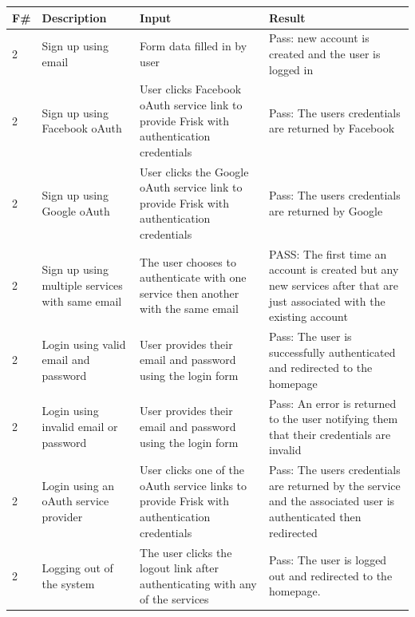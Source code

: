 \begin{longtable}{@{}p{}p{}p{}p{}@{}}
	\toprule
	F\# & Description & Input & Result \\ \midrule
	
	2 & Sign up using email & Form data filled in by user & \textcolor{PassGreen}{Pass}: new account is created and the user is logged in\\
	
	2 & Sign up using Facebook oAuth & User clicks Facebook oAuth service link to provide Frisk with authentication credentials & \textcolor{PassGreen}{Pass}: The users credentials are returned by Facebook \\
	
	2 & Sign up using Google oAuth & User clicks the Google oAuth service link to provide Frisk with authentication credentials & \textcolor{PassGreen}{Pass}: The users credentials are returned by Google \\
	
	2 & Sign up using multiple services with same email & The user chooses to authenticate with one service then another with the same email & \textcolor{PassGreen}{PASS}: The first time an account is created but any new services after that are just associated with the existing account \\

	2 & Login using valid email and password & User provides their email and password using the login form & \textcolor{PassGreen}{Pass}: The user is successfully authenticated and redirected to the homepage \\
	
	2 & Login using invalid email or password & User provides their email and password using the login form &  \textcolor{PassGreen}{Pass}: An error is returned to the user notifying them that their credentials are invalid \\
	
	2 & Login using an oAuth service provider & User clicks one of the oAuth service links to provide Frisk with authentication credentials & \textcolor{PassGreen}{Pass}: The users credentials are returned by the service and the associated user is authenticated then redirected \\
	
	2 & Logging out of the system & The user clicks the logout link after authenticating with any of the services & \textcolor{PassGreen}{Pass}: The user is logged out and redirected to the homepage. \\
	

\end{longtable}
